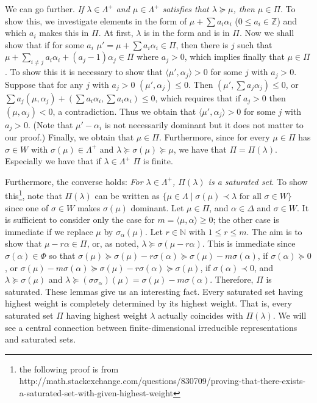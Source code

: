 \documentclass{article}
\newcommand{\NaN}{\mathbb{N}}
\newcommand{\InZ}{\mathbb{Z}}
\newcommand{\SBar}{\;|\;}
\begin{document}
We can go further.
\textit{If $\lambda \in \Lambda^+$ and $\mu \in \Lambda^+$ satisfies that $\lambda \succeq \mu$, then $\mu \in \Pi$}.
To show this, we investigate elements in the form of $\mu + \sum a_i \alpha_i$ ($0 \le a_i \in \InZ$) and which $a_i$ makes this in $\Pi$.
At first, $\lambda$ is in the form and is in $\Pi$.
Now we shall show that if for some $a_i$ $\mu' = \mu + \sum a_i \alpha_i \in \Pi$, then there is $j$ such that $\mu + \sum_{i \ne j} a_i \alpha_i + (a_j - 1) \alpha_j \in \Pi$ where $a_j > 0$, which implies finally that $\mu \in \Pi$.
To show this it is necessary to show that $\langle \mu', \alpha_j \rangle > 0$ for some $j$ with $a_j > 0$.
Suppose that for any $j$ with $a_j > 0$ $(\mu', \alpha_j) \le 0$.
Then $(\mu', \sum a_j \alpha_j) \le 0$, or $\sum a_j (\mu, \alpha_j) + (\sum a_i \alpha_i, \sum a_i \alpha_i) \le 0$, which requires that if $a_j > 0$ then $(\mu, \alpha_j) < 0$, a contradiction.
Thus we obtain that $\langle \mu', \alpha_j \rangle > 0$ for some $j$ with $a_j > 0$.
(Note that $\mu' - \alpha_i$ is not necessarily dominant but it does not matter to our proof.)
Finally, we obtain that $\mu \in \Pi$.
Furthermore, since for every $\mu \in \Pi$ has $\sigma \in W$ with $\sigma(\mu) \in \Lambda^+$ and $\lambda \succeq \sigma(\mu) \succeq \mu$, we have that $\Pi = \Pi(\lambda)$.
Especially we have that if $\lambda \in \Lambda^+$ $\Pi$ is finite.

Furthermore, the converse holds: \textit{For $\lambda \in \Lambda^+$, $\Pi(\lambda)$ is a saturated set}.
To show this\footnote{the following proof is from http://math.stackexchange.com/questions/830709/proving-that-there-exists-a-saturated-set-with-given-highest-weight}, note that $\Pi(\lambda)$ can be written as $\{\mu \in \Lambda \SBar \sigma(\mu) \prec \lambda \textrm{ for all $\sigma \in W$}\}$ since one of $\sigma \in W$ makes $\sigma(\mu)$ dominant.
Let $\mu \in \Pi$, and $\alpha \in \Delta$ and $\sigma \in W$.
It is sufficient to consider only the case for $m = \langle \mu, \alpha \rangle \ge 0$; the other case is immediate if we replace $\mu$ by $\sigma_\alpha(\mu)$.
Let $r \in \NaN$ with $1 \le r \le m$.
The aim is to show that $\mu - r\alpha \in \Pi$, or, as noted, $\lambda \succeq \sigma(\mu - r\alpha)$.
This is immediate since $\sigma(\alpha) \in \Phi$ so that $\sigma(\mu) \succeq \sigma(\mu) - r\sigma(\alpha) \succeq \sigma(\mu) - m\sigma(\alpha)$, if $\sigma(\alpha) \succeq 0$, or $\sigma(\mu) - m\sigma(\alpha) \succeq \sigma(\mu) - r\sigma(\alpha) \succeq \sigma(\mu)$, if $\sigma(\alpha) \prec 0$, and $\lambda \succeq \sigma(\mu)$ and $\lambda \succeq (\sigma \sigma_\alpha)(\mu) = \sigma(\mu) - m\sigma(\alpha)$.
Therefore, $\Pi$ is saturated.
These lemmas give us an interesting fact.
Every saturated set having highest weight is completely determined by its highest weight.
That is, every saturated set $\Pi$ having highest weight $\lambda$ actually coincides with $\Pi(\lambda)$.
We will see a central connection between finite-dimensional irreducible representations and saturated sets.
\end{document}
